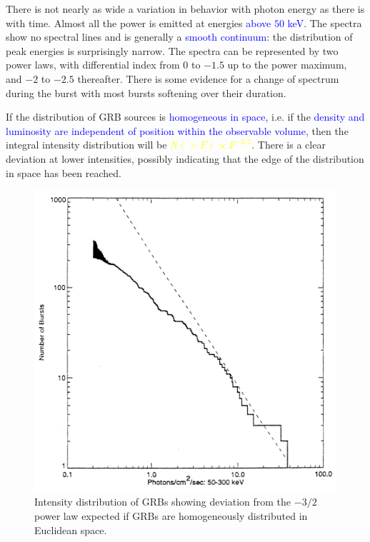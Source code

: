 \documentclass[12pt,a4paper]{article}
\begin{document}
There is not nearly as wide a variation in behavior with photon energy as there is with time. Almost all the power is emitted at energies \textcolor{blue}{above $50$ keV}. The spectra show no spectral lines and is generally a \textcolor{blue}{smooth continuum}: the distribution of peak energies is surprisingly narrow. The spectra can be represented by two power laws, with differential index from $0$ to $-1.5$ up to the power maximum, and $-2$ to $-2.5$ thereafter. There is some evidence for a change of spectrum during the burst with most bursts softening over their duration.


If the distribution of GRB sources is \textcolor{blue}{homogeneous in space}, i.e. if the \textcolor{blue}{density and luminosity are independent of position within the observable volume}, then the integral intensity distribution will be \textcolor{yellow}{$N(> F) \propto F^{-3/2}$}. There is a clear deviation at lower intensities, possibly indicating that the edge of the distribution in space has been reached.

\begin{figure}
\begin{center}
\includegraphics[width=12cm]{GRBdistribution.png}
\caption{Intensity distribution of GRBs showing deviation from the $-3/2$ power law expected if GRBs are homogeneously distributed in Euclidean space. 
}
\label{FIG:synchro_spectrum2}
\end{center}
\end{figure}
\end{document}
